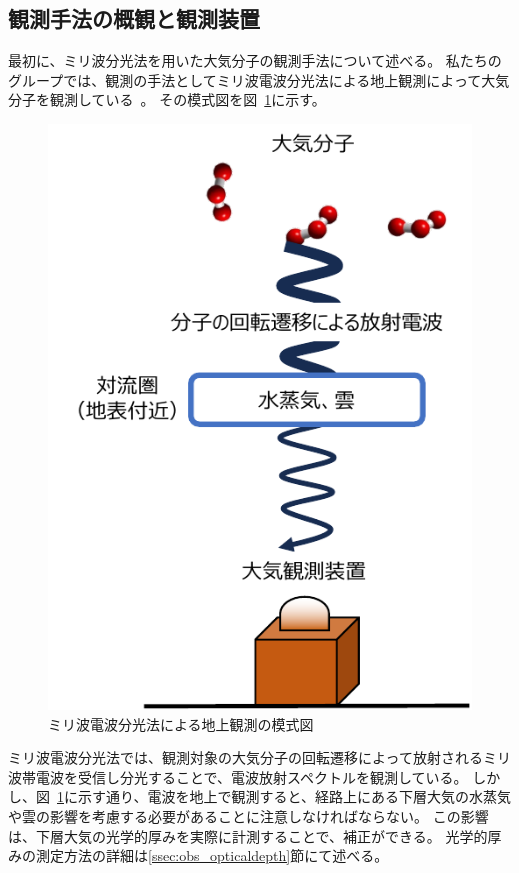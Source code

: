 \subsection{観測手法の概観と観測装置}
\label{ssec:obs_overview}
最初に、ミリ波分光法を用いた大気分子の観測手法について述べる。
私たちのグループでは、観測の手法としてミリ波電波分光法による地上観測によって大気分子を観測している~\cite{mizuno2002millimeter}。
その模式図を図~\ref{fig:spectrometer_schema}に示す。
\begin{figure}[htbp]
    \centering
    \includegraphics{master_thesis_contents/master_thesis_fig/spectrometer_schema.pdf}
    \caption{ミリ波電波分光法による地上観測の模式図}
    \label{fig:spectrometer_schema}
\end{figure}
ミリ波電波分光法では、観測対象の大気分子の回転遷移によって放射されるミリ波帯電波を受信し分光することで、電波放射スペクトルを観測している。
しかし、図~\ref{fig:spectrometer_schema}に示す通り、電波を地上で観測すると、経路上にある下層大気の水蒸気や雲の影響を考慮する必要があることに注意しなければならない。
この影響は、下層大気の光学的厚みを実際に計測することで、補正ができる。
光学的厚みの測定方法の詳細は\ref{ssec:obs_opticaldepth}節にて述べる。\par

